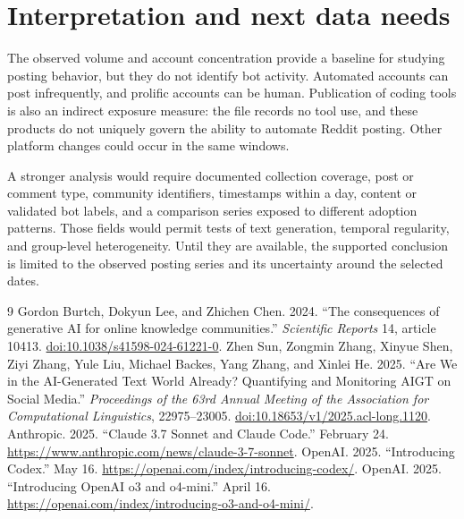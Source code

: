 \documentclass[11pt]{article}
\begin{document}
\section{Interpretation and next data needs}
The observed volume and account concentration provide a baseline for studying posting behavior, but they do not identify bot activity. Automated accounts can post infrequently, and prolific accounts can be human. Publication of coding tools is also an indirect exposure measure: the file records no tool use, and these products do not uniquely govern the ability to automate Reddit posting. Other platform changes could occur in the same windows.

A stronger analysis would require documented collection coverage, post or comment type, community identifiers, timestamps within a day, content or validated bot labels, and a comparison series exposed to different adoption patterns. Those fields would permit tests of text generation, temporal regularity, and group-level heterogeneity. Until they are available, the supported conclusion is limited to the observed posting series and its uncertainty around the selected dates.

\begin{thebibliography}{9}
 Gordon Burtch, Dokyun Lee, and Zhichen Chen. 2024. ``The consequences of generative AI for online knowledge communities.'' \emph{Scientific Reports} 14, article 10413. \href{https://doi.org/10.1038/s41598-024-61221-0}{doi:10.1038/s41598-024-61221-0}.
 Zhen Sun, Zongmin Zhang, Xinyue Shen, Ziyi Zhang, Yule Liu, Michael Backes, Yang Zhang, and Xinlei He. 2025. ``Are We in the AI-Generated Text World Already? Quantifying and Monitoring AIGT on Social Media.'' \emph{Proceedings of the 63rd Annual Meeting of the Association for Computational Linguistics}, 22975--23005. \href{https://doi.org/10.18653/v1/2025.acl-long.1120}{doi:10.18653/v1/2025.acl-long.1120}.
 Anthropic. 2025. ``Claude 3.7 Sonnet and Claude Code.'' February 24. \url{https://www.anthropic.com/news/claude-3-7-sonnet}.
 OpenAI. 2025. ``Introducing Codex.'' May 16. \url{https://openai.com/index/introducing-codex/}.
 OpenAI. 2025. ``Introducing OpenAI o3 and o4-mini.'' April 16. \url{https://openai.com/index/introducing-o3-and-o4-mini/}.
\end{thebibliography}
\end{document}
